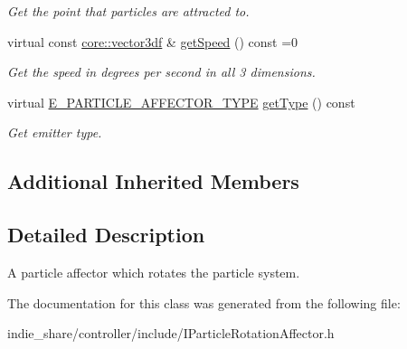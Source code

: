 \begin{DoxyCompactItemize}
\begin{DoxyCompactList}\small\item\em Get the point that particles are attracted to. \end{DoxyCompactList}\item 
\mbox{\label{classirr_1_1scene_1_1IParticleRotationAffector_a49274165a72699096b84e99bbfc64470}} 
virtual const \hyperlink{namespaceirr_1_1core_ae6e2b2a6c552833ebbd5b7463d03586b}{core\+::vector3df} \& \hyperlink{classirr_1_1scene_1_1IParticleRotationAffector_a49274165a72699096b84e99bbfc64470}{get\+Speed} () const =0
\begin{DoxyCompactList}\small\item\em Get the speed in degrees per second in all 3 dimensions. \end{DoxyCompactList}\item 
\mbox{\label{classirr_1_1scene_1_1IParticleRotationAffector_a01055bd7d4720418bc2a3b16fce58571}} 
virtual \hyperlink{namespaceirr_1_1scene_a34c0f9475cfcbda8b50ad816a046010b}{E\+\_\+\+P\+A\+R\+T\+I\+C\+L\+E\+\_\+\+A\+F\+F\+E\+C\+T\+O\+R\+\_\+\+T\+Y\+PE} \hyperlink{classirr_1_1scene_1_1IParticleRotationAffector_a01055bd7d4720418bc2a3b16fce58571}{get\+Type} () const
\begin{DoxyCompactList}\small\item\em Get emitter type. \end{DoxyCompactList}\end{DoxyCompactItemize}
\subsection*{Additional Inherited Members}


\subsection{Detailed Description}
A particle affector which rotates the particle system. 

The documentation for this class was generated from the following file\+:\begin{DoxyCompactItemize}
\item 
indie\+\_\+share/controller/include/I\+Particle\+Rotation\+Affector.\+h\end{DoxyCompactItemize}
